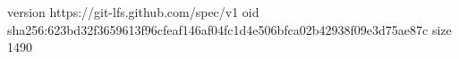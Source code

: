 version https://git-lfs.github.com/spec/v1
oid sha256:623bd32f3659613f96cfeaf146af04fc1d4e506bfca02b42938f09e3d75ae87c
size 1490
